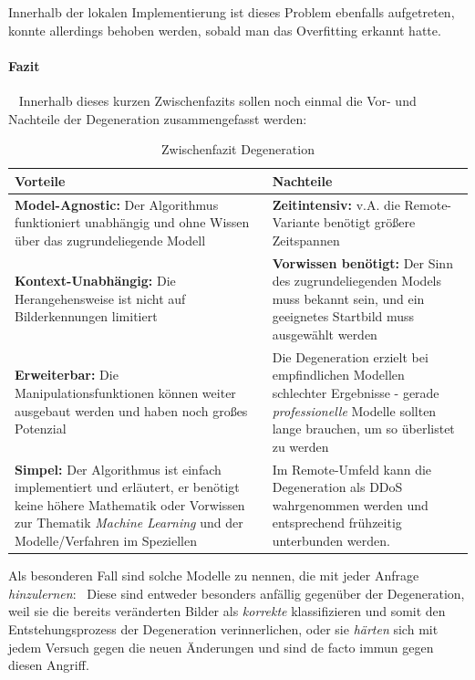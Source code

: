 Innerhalb der lokalen Implementierung ist dieses Problem ebenfalls aufgetreten, konnte allerdings behoben werden, sobald man das Overfitting erkannt hatte.
\paragraph{Fazit} ~\newline
Innerhalb dieses kurzen Zwischenfazits sollen noch einmal die Vor- und Nachteile der Degeneration zusammengefasst werden:
\begin{table}[h]
	\centering
\begin{tabular}{|p{7.5cm}|p{7.5cm}|}
	\hline 
	\textbf{Vorteile} & \textbf{Nachteile} \\ 
	\hline 
	\textbf{Model-Agnostic:} \newline Der Algorithmus funktioniert unabhängig und ohne Wissen über das zugrundeliegende Modell & \textbf{Zeitintensiv:} \newline v.A. die Remote-Variante benötigt größere Zeitspannen \\ 
	\hline 
	\textbf{Kontext-Unabhängig:} \newline Die Herangehensweise ist nicht auf Bilderkennungen limitiert & \textbf{Vorwissen benötigt:} \newline Der Sinn des zugrundeliegenden Models muss bekannt sein, und ein geeignetes Startbild muss ausgewählt werden  \\ 
	\hline 
	\textbf{Erweiterbar:} \newline Die Manipulationsfunktionen können weiter ausgebaut werden und haben noch großes Potenzial & Die Degeneration erzielt bei empfindlichen Modellen schlechter Ergebnisse - gerade \textit{professionelle} Modelle sollten lange brauchen, um so überlistet zu werden \\ 
	\hline 
	\textbf{Simpel:} \newline Der Algorithmus ist einfach implementiert und erläutert, er benötigt keine höhere Mathematik oder Vorwissen zur Thematik \textit{Machine Learning} und der Modelle/Verfahren im Speziellen & Im Remote-Umfeld kann die Degeneration als DDoS wahrgenommen werden und entsprechend frühzeitig unterbunden werden. \\ 
	\hline 
\end{tabular} 
\caption{Zwischenfazit Degeneration}
\label{tab:FazitDegeneration}
\end{table}
Als besonderen Fall sind solche Modelle zu nennen, die mit jeder Anfrage \textit{hinzulernen}: ~\newline Diese sind entweder besonders anfällig gegenüber der Degeneration, weil sie die bereits veränderten Bilder als \textit{korrekte} klassifizieren und somit den Entstehungsprozess der Degeneration verinnerlichen, oder sie \textit{härten} sich mit jedem Versuch gegen die neuen Änderungen und sind de facto immun gegen diesen Angriff.  

